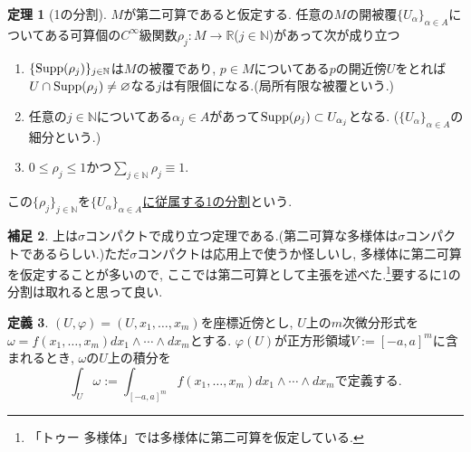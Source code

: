 \documentclass[dvipdfmx,a4paper,11pt]{article}
\newcommand{\R}{\mathbb{R}}
\newcommand{\N}{\mathbb{N}}
\newcommand{\Supp}{{\rm Supp}}
\theoremstyle{definition}
\newtheorem{thm}{定理}
\newtheorem{dfn}[thm]{定義}
\newtheorem{rem}[thm]{補足}
\begin{document}
 \begin{tcolorbox}[
    colback = white,
    colframe = green!35!black,
    fonttitle = \bfseries,
    breakable = true]
\begin{thm}[1の分割]
$M$が第二可算であると仮定する.
任意の$M$の開被覆$\{U_{\alpha}\}_{\alpha \in A}$についてある可算個の$C^{\infty}$級関数$\rho_{j} : M \rightarrow \R$($j \in \N$)があって次が成り立つ
\begin{enumerate}
 \setlength{\parskip}{0cm}
  \setlength{\itemsep}{2pt} 
\item $\{ \Supp(\rho_{j})\}_{j \in \N}$は$M$の被覆であり, $p \in M$についてある$p$の開近傍$U$をとれば$U \cap \Supp(\rho_{j}) \neq \varnothing$なる$j$は有限個になる.(局所有限な被覆という.)
\item 任意の$j \in \N$についてある$\alpha_{j} \in A$があって$\Supp(\rho_{j}) \subset U_{\alpha_j}$となる. ($\{U_{\alpha}\}_{\alpha \in A}$の細分という.)
\item $0 \le \rho_j \le 1$かつ$\sum_{j \in \N} \rho_{j} \equiv 1$.
\end{enumerate}
この$\{ \rho_{j} \}_{j \in \N}$を\underline{$\{U_{\alpha}\}_{\alpha \in A}$に従属する1の分割}という.
     \end{thm}
    \end{tcolorbox} 
\begin{rem}
上は$\sigma$コンパクトで成り立つ定理である.(第二可算な多様体は$\sigma$コンパクトであるらしい.)ただ$\sigma$コンパクトは応用上で使うか怪しいし, 多様体に第二可算を仮定することが多いので, ここでは第二可算として主張を述べた.\footnote{「トゥー 多様体」では多様体に第二可算を仮定している.}要するに1の分割は取れると思って良い. 
\end{rem}

 
  \begin{tcolorbox}[
    colback = white,
    colframe = green!35!black,
    fonttitle = \bfseries,
    breakable = true]
\begin{dfn}
\label{integral_local}
$(U, \varphi) = (U, x_1, \ldots, x_m)$を座標近傍とし, $U$上の$m$次微分形式を$\omega = f(x_1, \ldots, x_m)dx_1 \wedge \cdots \wedge dx_m$とする.
$\varphi(U)$が正方形領域$V:=[-a,a]^{m}$に含まれるとき, $\omega$の$U$上の積分を
$$
\int_{U} \omega := \int_{[-a,a]^{m}}f(x_1, \ldots, x_m)dx_1 \wedge \cdots \wedge dx_m
\text{で定義する.}
$$
    \end{dfn}
    \end{tcolorbox} 
    
\end{document}
